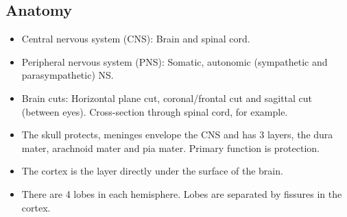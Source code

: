 \documentclass[a4paper, 12pt]{article}
\begin{document}
\subsection{Anatomy}
\begin{itemize}[noitemsep,nolistsep]
	\item Central nervous system (CNS): Brain and spinal cord.
	\item Peripheral nervous system (PNS): Somatic, autonomic (sympathetic and parasympathetic) NS.
	\item Brain cuts: Horizontal plane cut, coronal/frontal cut and sagittal cut (between eyes). Cross-section through spinal cord, for example.
	\item The skull protects, meninges envelope the CNS and has 3 layers, the dura mater, arachnoid mater and pia mater. Primary function is protection.
	\item The cortex is the layer directly under the surface of the brain.
	\item There are 4 lobes in each hemisphere. Lobes are separated by fissures in the cortex.
\end{itemize}
\end{document}
